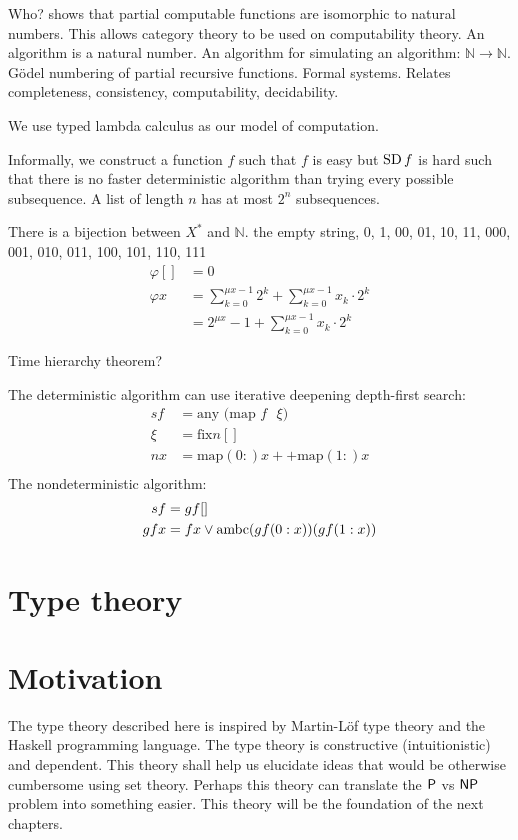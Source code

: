 Who? shows that partial computable functions are isomorphic to natural numbers.
This allows category theory to be used on computability theory.
An algorithm is a natural number.
An algorithm for simulating an algorithm: $\mathbb N \to \mathbb N$.
G\"odel numbering of partial recursive functions.
Formal systems.
Relates completeness, consistency, computability, decidability.

We use typed lambda calculus as our model of computation.

Informally, we construct a function $f$ such that $f$ is easy but $\operatorname{SD} f$ is hard
such that there is no faster deterministic algorithm
than trying every possible subsequence.
A list of length $n$ has at most $2^n$ subsequences.

There is a bijection between $X^*$ and $\mathbb N$.
the empty string, 0, 1, 00, 01, 10, 11, 000, 001, 010, 011, 100, 101, 110, 111
\begin{align}
    \varphi [] &= 0
  \\ \varphi x &= \sum_{k=0}^{\mu x - 1} 2^k + \sum_{k=0}^{\mu x - 1} x_k \cdot 2^k
            \\ &= 2^{\mu x} - 1 + \sum_{k=0}^{\mu x - 1} x_k \cdot 2^k
\end{align}

Time hierarchy theorem?

The deterministic algorithm can use iterative deepening depth-first search:
\begin{align}
    sf &= \text{any $($map $f$ $\xi)$}
    \\
    \xi &= \text{fix} n []
    \\
    nx &= \text{map} (0:) x ++ \text{map} (1:) x
    \\
\end{align}
The nondeterministic algorithm:
\begin{align}
    sf &= gf[]
    \\
    gfx &= fx \vee \operatorname{ambc} (gf(0:x)) (gf(1:x))
\end{align}

\section{Type theory}

\section{Motivation}

The type theory described here is inspired by
Martin-L\"of type theory
and the Haskell programming language.
The type theory is constructive (intuitionistic) and dependent.
This theory shall help us elucidate ideas that
would be otherwise cumbersome using set theory.
Perhaps this theory can translate the $\mathsf{P}$ vs $\mathsf{NP}$ problem
into something easier.
This theory will be the foundation
of the next chapters.

